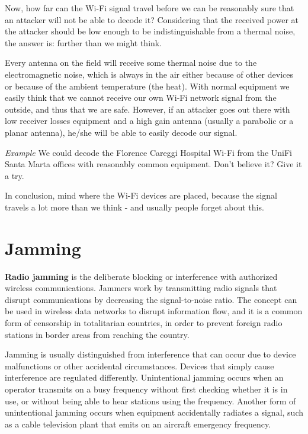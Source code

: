 Now, how far can the Wi-Fi signal travel before we can be reasonably sure that an attacker will not be able to decode it? Considering that the received power at the attacker should be low enough to be indistinguishable from a thermal noise, the answer is: further than we might think.

Every antenna on the field will receive some thermal noise due to the electromagnetic noise, which is always in the air either because of other devices or because of the ambient temperature (the heat). With normal equipment we easily think that we cannot receive our own Wi-Fi network signal from the outside, and thus that we are safe. However, if an attacker goes out there with low receiver losses equipment and a high gain antenna (usually a parabolic or a planar antenna), he/she will be able to easily decode our signal.

\vspace{0.5em}

\emph{Example} We could decode the Florence Careggi Hospital Wi-Fi from the UniFi Santa Marta offices with reasonably common equipment. Don't believe it? Give it a try.

\vspace{0.5em}

In conclusion, mind where the Wi-Fi devices are placed, because the signal travels a lot more than we think - and usually people forget about this.


\section{Jamming}
\textbf{Radio jamming} is the deliberate blocking or interference with authorized wireless communications. Jammers work by transmitting radio signals that disrupt communications by decreasing the signal-to-noise ratio. The concept can be used in wireless data networks to disrupt information flow, and it is a common form of censorship in totalitarian countries, in order to prevent foreign radio stations in border areas from reaching the country.

Jamming is usually distinguished from interference that can occur due to device malfunctions or other accidental circumstances. Devices that simply cause interference are regulated differently. Unintentional jamming occurs when an operator transmits on a busy frequency without first checking whether it is in use, or without being able to hear stations using the frequency. Another form of unintentional jamming occurs when equipment accidentally radiates a signal, such as a cable television plant that emits on an aircraft emergency frequency.

